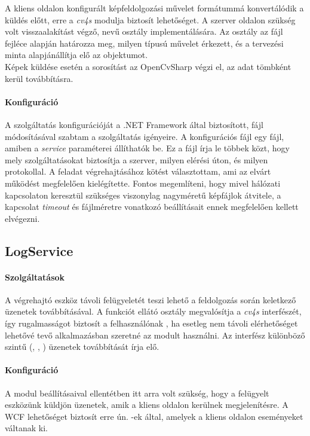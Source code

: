 A kliens oldalon konfigurált képfeldolgozási művelet  formátummá konvertálódik a küldés előtt, erre a \emph{cv4s}  modulja biztosít lehetőséget. A szerver oldalon szükség volt visszaalakítást végző,  nevű osztály implementálására. Az osztály az  fájl fejléce alapján határozza meg, milyen típusú művelet érkezett, és a  tervezési minta alapjánállítja elő az objektumot.\\
Képek küldése esetén a sorosítást az OpenCvSharp végzi el, az adat  tömbként kerül továbbításra.

\paragraph{Konfiguráció} A szolgáltatás konfigurációját a .NET Framework által biztosított,  fájl módosításával szabtam a szolgáltatás igényeire. A konfigurációs fájl egy  fájl, amiben a \emph{service} paraméterei állíthatók be. Ez a fájl írja le többek közt, hogy mely szolgáltatásokat biztosítja a szerver, milyen elérési úton, és milyen protokollal. A feladat végrehajtásához  kötést választottam, ami az elvárt működést megfelelően kielégítette. Fontos megemlíteni, hogy mivel hálózati kapcsolaton keresztül szükséges viszonylag nagyméretű képfájlok átvitele, a kapcsolat \emph{timeout} és fájlméretre vonatkozó beállításait ennek megfelelően kellett elvégezni.

\subsection{LogService}

\paragraph{Szolgáltatások} A végrehajtó eszköz távoli felügyeletét teszi lehető a feldolgozás során keletkező üzenetek továbbításával. A funkciót ellátó osztály megvalósítja a \emph{cv4s}  interfészét, így rugalmasságot biztosít a felhasználónak , ha esetleg nem távoli elérhetőséget lehetővé tevő alkalmazásban szeretné az  modult használni. Az interfész különböző szintű (, , ) üzenetek továbbítását írja elő.

\paragraph{Konfiguráció} A  modul beállításaival ellentétben itt arra volt szükség, hogy a felügyelt eszközünk küldjön üzenetek, amik a kliens oldalon kerülnek megjelenítésre. A WCF lehetőséget biztosít erre ún. -ek által, amelyek a kliens oldalon eseményeket váltanak ki.

